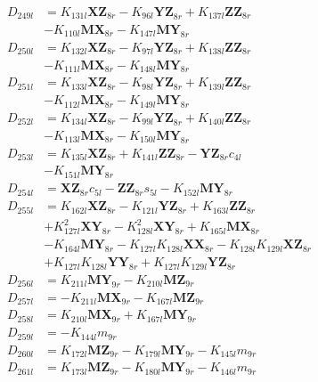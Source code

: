 \begin{multicols}{2}
\begin{align}
D_{249l} &= K_{131l}\mathbf{XZ}_{8r} - K_{96l}\mathbf{YZ}_{8r} + K_{137l}\mathbf{ZZ}_{8r}  \nonumber \\
&- K_{110l}\mathbf{MX}_{8r} - K_{147l}\mathbf{MY}_{8r} \nonumber \\
D_{250l} &= K_{132l}\mathbf{XZ}_{8r} - K_{97l}\mathbf{YZ}_{8r} + K_{138l}\mathbf{ZZ}_{8r}  \nonumber \\
&- K_{111l}\mathbf{MX}_{8r} - K_{148l}\mathbf{MY}_{8r} \nonumber \\
D_{251l} &= K_{133l}\mathbf{XZ}_{8r} - K_{98l}\mathbf{YZ}_{8r} + K_{139l}\mathbf{ZZ}_{8r}  \nonumber \\
&- K_{112l}\mathbf{MX}_{8r} - K_{149l}\mathbf{MY}_{8r} \nonumber \\
D_{252l} &= K_{134l}\mathbf{XZ}_{8r} - K_{99l}\mathbf{YZ}_{8r} + K_{140l}\mathbf{ZZ}_{8r}  \nonumber \\
&- K_{113l}\mathbf{MX}_{8r} - K_{150l}\mathbf{MY}_{8r} \nonumber \\
D_{253l} &= K_{135l}\mathbf{XZ}_{8r} + K_{141l}\mathbf{ZZ}_{8r} - \mathbf{YZ}_{8r}c_{4l}  \nonumber \\
&- K_{151l}\mathbf{MY}_{8r} \nonumber \\
D_{254l} &= \mathbf{XZ}_{8r}c_{5l} - \mathbf{ZZ}_{8r}s_{5l} - K_{152l}\mathbf{MY}_{8r} \nonumber \\
D_{255l} &= K_{162l}\mathbf{XZ}_{8r} - K_{121l}\mathbf{YZ}_{8r} + K_{163l}\mathbf{ZZ}_{8r}  \nonumber \\
&+ K_{127l}^2\mathbf{XY}_{8r} - K_{128l}^2\mathbf{XY}_{8r} + K_{165l}\mathbf{MX}_{8r}  \nonumber \\
&- K_{164l}\mathbf{MY}_{8r} - K_{127l}K_{128l}\mathbf{XX}_{8r} - K_{128l}K_{129l}\mathbf{XZ}_{8r}  \nonumber \\
&+ K_{127l}K_{128l}\mathbf{YY}_{8r} + K_{127l}K_{129l}\mathbf{YZ}_{8r} \nonumber \\
D_{256l} &= K_{211l}\mathbf{MY}_{9r} - K_{210l}\mathbf{MZ}_{9r} \nonumber \\
D_{257l} &= - K_{211l}\mathbf{MX}_{9r} - K_{167l}\mathbf{MZ}_{9r} \nonumber \\
D_{258l} &= K_{210l}\mathbf{MX}_{9r} + K_{167l}\mathbf{MY}_{9r} \nonumber \\
D_{259l} &= -K_{144l}m_{9r} \nonumber \\
D_{260l} &= K_{172l}\mathbf{MZ}_{9r} - K_{179l}\mathbf{MY}_{9r} - K_{145l}m_{9r} \nonumber \\
D_{261l} &= K_{173l}\mathbf{MZ}_{9r} - K_{180l}\mathbf{MY}_{9r} - K_{146l}m_{9r} \nonumber \\

\end{align}
\end{multicols}
